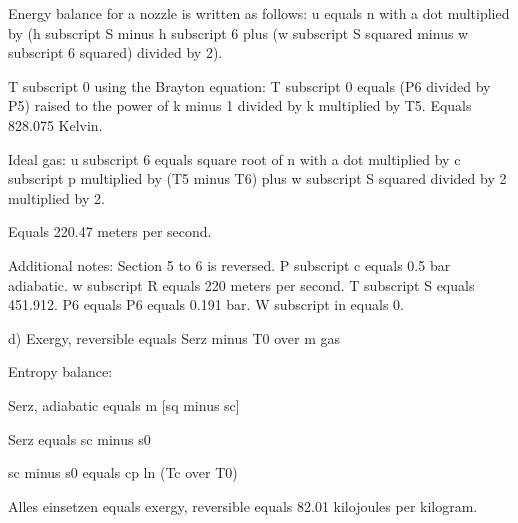 Energy balance for a nozzle is written as follows:
u equals n with a dot multiplied by (h subscript S minus h subscript 6 plus (w subscript S squared minus w subscript 6 squared) divided by 2).

T subscript 0 using the Brayton equation:
T subscript 0 equals (P6 divided by P5) raised to the power of k minus 1 divided by k multiplied by T5.
Equals 828.075 Kelvin.

Ideal gas:
u subscript 6 equals square root of n with a dot multiplied by c subscript p multiplied by (T5 minus T6) plus w subscript S squared divided by 2 multiplied by 2.

Equals 220.47 meters per second.

Additional notes:
Section 5 to 6 is reversed.
P subscript c equals 0.5 bar adiabatic.
w subscript R equals 220 meters per second.
T subscript S equals 451.912.
P6 equals P6 equals 0.191 bar.
W subscript in equals 0.

d) Exergy, reversible equals Serz minus T0 over m gas

Entropy balance:

Serz, adiabatic equals m [sq minus sc]

Serz equals sc minus s0

sc minus s0 equals cp ln (Tc over T0)

Alles einsetzen equals exergy, reversible equals 82.01 kilojoules per kilogram.